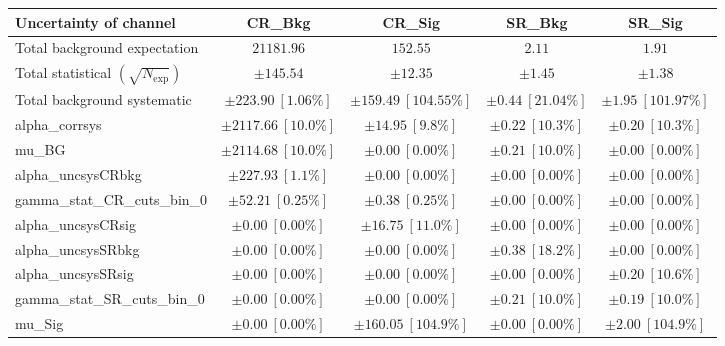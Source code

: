 
\begin{table}
\centering
\small
\begin{tabular*}{\textwidth}{@{\extracolsep{\fill}}lcccc}
\toprule
\textbf{Uncertainty of channel}                                    & CR\_Bkg            & CR\_Sig            & SR\_Bkg            & SR\_Sig            \\
\midrule
Total background expectation             &  $21181.96$        &  $152.55$        &  $2.11$        &  $1.91$       \\
\midrule
Total statistical $(\sqrt{N_{\mathrm{exp}}})$              & $\pm 145.54$        & $\pm 12.35$        & $\pm 1.45$        & $\pm 1.38$       \\
Total background systematic               & $\pm 223.90\ [1.06\%] $        & $\pm 159.49\ [104.55\%] $        & $\pm 0.44\ [21.04\%] $        & $\pm 1.95\ [101.97\%] $             \\
\midrule
alpha\_corrsys         & $\pm 2117.66\ [10.0\%] $          & $\pm 14.95\ [9.8\%] $          & $\pm 0.22\ [10.3\%] $          & $\pm 0.20\ [10.3\%] $       \\
mu\_BG         & $\pm 2114.68\ [10.0\%] $          & $\pm 0.00\ [0.00\%] $          & $\pm 0.21\ [10.0\%] $          & $\pm 0.00\ [0.00\%] $       \\
alpha\_uncsysCRbkg         & $\pm 227.93\ [1.1\%] $          & $\pm 0.00\ [0.00\%] $          & $\pm 0.00\ [0.00\%] $          & $\pm 0.00\ [0.00\%] $       \\
gamma\_stat\_CR\_cuts\_bin\_0         & $\pm 52.21\ [0.25\%] $          & $\pm 0.38\ [0.25\%] $          & $\pm 0.00\ [0.00\%] $          & $\pm 0.00\ [0.00\%] $       \\
alpha\_uncsysCRsig         & $\pm 0.00\ [0.00\%] $          & $\pm 16.75\ [11.0\%] $          & $\pm 0.00\ [0.00\%] $          & $\pm 0.00\ [0.00\%] $       \\
alpha\_uncsysSRbkg         & $\pm 0.00\ [0.00\%] $          & $\pm 0.00\ [0.00\%] $          & $\pm 0.38\ [18.2\%] $          & $\pm 0.00\ [0.00\%] $       \\
alpha\_uncsysSRsig         & $\pm 0.00\ [0.00\%] $          & $\pm 0.00\ [0.00\%] $          & $\pm 0.00\ [0.00\%] $          & $\pm 0.20\ [10.6\%] $       \\
gamma\_stat\_SR\_cuts\_bin\_0         & $\pm 0.00\ [0.00\%] $          & $\pm 0.00\ [0.00\%] $          & $\pm 0.21\ [10.0\%] $          & $\pm 0.19\ [10.0\%] $       \\
mu\_Sig         & $\pm 0.00\ [0.00\%] $          & $\pm 160.05\ [104.9\%] $          & $\pm 0.00\ [0.00\%] $          & $\pm 2.00\ [104.9\%] $       \\


\end{tabular*}
\end{table}
